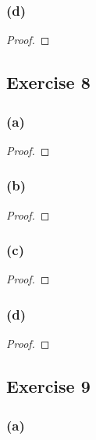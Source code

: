 \documentclass[14pt]{extarticle}
\begin{document}
\subsubsection{(d)}

\begin{proof}

\end{proof}

\subsection{Exercise 8}

\subsubsection{(a)}

\begin{proof}

\end{proof}

\subsubsection{(b)}

\begin{proof}

\end{proof}

\subsubsection{(c)}

\begin{proof}

\end{proof}

\subsubsection{(d)}

\begin{proof}

\end{proof}

\subsection{Exercise 9}

\subsubsection{(a)}
\end{document}

